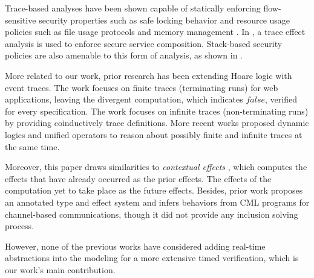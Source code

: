 \documentclass[acmsmall,10pt,review]{acmart}
\newcommand{\code}[1]{{\tt{\ensuremath{\m{#1}}}}}
\newcommand{\m}{\mathit}
\begin{document}
{{{Trace-based analyses have been shown capable of statically enforcing flow-sensitive security properties such as safe locking behavior \cite{DBLP:conf/pldi/FosterTA02} and resource usage policies such as file usage protocols and memory management \cite{DBLP:conf/aplas/MarriottSS03}. In \cite{DBLP:conf/csfw/BartolettiDF05}, a trace effect analysis is used to enforce secure service composition. 
 Stack-based security policies are also amenable to this form of analysis, as shown in \cite{DBLP:conf/aplas/SkalkaS04}. 
 

 

 
More related to our work, prior research has been extending Hoare logic with event traces. The work \cite{DBLP:journals/jsc/MalechaMW11} focuses on finite traces (terminating runs) for web applications, leaving the divergent computation, which indicates \code{false}, verified for every specification. The work \cite{DBLP:conf/esop/NakataU10} focuses on infinite traces (non-terminating runs) by providing coinductively trace definitions. 
More recent works \cite{DBLP:conf/tableaux/BubelDHN15,DBLP:conf/icfem/SongC20} proposed dynamic logics and unified operators to reason about possibly finite and infinite traces at the same time. 

Moreover, this paper draws similarities to \textit{contextual effects} \cite{DBLP:conf/popl/NeamtiuHFP08}, which computes the effects that have already occurred as the prior effects. The effects of the computation yet to take place as the future effects. 
Besides, prior work \cite{DBLP:conf/fase/NielsonAN98} proposes an annotated type and effect system and infers behaviors from CML \cite{DBLP:conf/mcmaster/Reppy93} programs for channel-based communications, though it did not provide any inclusion solving process. 



However, none of the previous works have considered adding real-time abstractions into the modeling for a more extensive timed verification, which is our work's main contribution.



 
%
%
%
 






}}}
\end{document}
